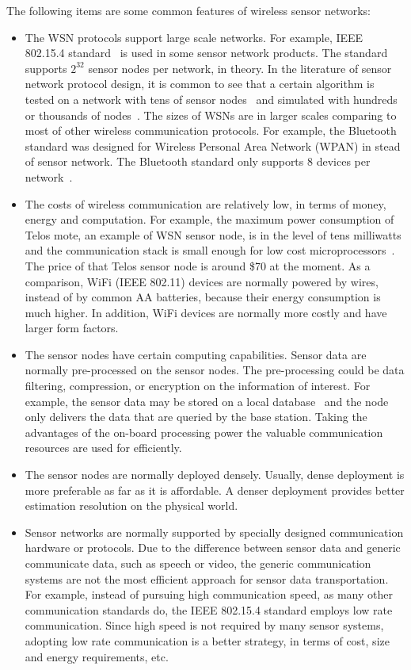 The following items are some common features of wireless sensor networks:

\begin{itemize}
\item The WSN protocols support large scale networks.
For example, IEEE 802.15.4 standard~\cite{Standard802.15.4.2003} is used in some sensor network products. The standard supports $2^{32}$ sensor nodes per network, in theory.
    In the literature of sensor network protocol design, it is common to see that a certain algorithm is tested on a network with tens of sensor nodes~\cite{rangwala06,WelshMoteTrack_LoCA2005-PUC} and simulated with hundreds or thousands of nodes~\cite{VuranSpatioTemporal04,Qi01survey}.
 The sizes of WSNs are in larger scales comparing to most of other wireless communication protocols. For example, the Bluetooth standard was designed for Wireless Personal Area Network (WPAN) in stead of sensor network. The Bluetooth standard only supports 8 devices per network~\cite{wiki:piconet}.
\item The costs of wireless communication are relatively low, in terms of money, energy and computation. For example, the maximum power consumption of Telos mote, an example of WSN sensor node, is in the level of tens milliwatts and the communication stack is small enough for low cost microprocessors~\cite{Polastre-telos}. The price of that Telos sensor node is around \$70 at the moment. As a comparison, WiFi (IEEE 802.11) devices are normally powered by wires, instead of by common AA batteries, because their energy consumption is much higher. In addition, WiFi devices are normally more costly and have larger form factors.
\item The sensor nodes have certain computing capabilities. Sensor data are normally pre-processed on the sensor nodes. The pre-processing could be data filtering, compression, or encryption on the information of interest. For example, the sensor data may be stored on a local database~\cite{GehrkeQueryProc2004} and the node only delivers the data that are queried by the base station. Taking the advantages of the on-board processing power the valuable communication resources are used for efficiently.
\item The sensor nodes are normally deployed densely. Usually, dense deployment is more preferable as far as it is affordable. A denser deployment provides better estimation resolution on the physical world.
\item Sensor networks are normally supported by specially designed communication hardware or protocols. Due to the difference between sensor data and generic communicate data, such as speech or video, the generic communication systems are not the most efficient approach for sensor data transportation. For example, instead of pursuing high communication speed, as many other communication standards do, the IEEE 802.15.4 standard employs low rate communication. Since high speed is not required by many sensor systems, adopting low rate communication is a better strategy, in terms of cost, size and energy requirements, etc.
\end{itemize}

